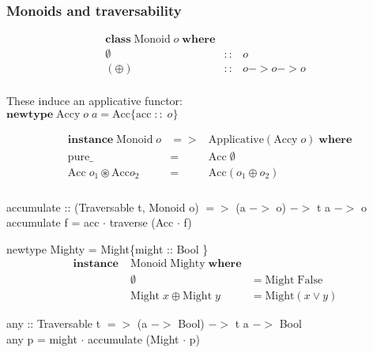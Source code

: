 \documentclass[18pt]{beamer}
\begin{document}
\begin{frame}[fragile]\frametitle{Monoids and traversability}
\begin{align*}
\mathbf{class} \; \mathrm{Monoid} \; o \; \mathbf{where}\\
\emptyset &::& o\\
(\oplus) &::& o -> o -> o
\end{align*}  \\
These induce an applicative functor:\\

$\mathbf{newtype} \; \mathrm{Accy} \; o\; a = \mathrm{Acc} \{\mathrm{acc} \; :: \;o \}$

\begin{align}
&\mathbf{instance} \; \mathrm{Monoid} \; o &=>& \mathrm{Applicative} (\mathrm{Accy}\; o) \; \mathbf{where}\\
&\mathrm{pure} \_ &=& \mathrm{Acc} \; \emptyset\\
&\mathrm{Acc} \; o_1 \circledast \mathrm{Acc} o_2 &=& \mathrm{Acc}(o_1 \oplus o_2)
\end{align}
\end{frame}

\begin{frame}[fragile] \frametitle{}

accumulate :: (Traversable t, Monoid o) $=>$ (a $->$ o) $->$ t a $->$ o
accumulate f = acc $\cdot$ traverse (Acc $\cdot$ f)

newtype Mighty = Might\{might :: Bool \}
\begin{align*}
\mathbf{instance} \; &\mathrm{Monoid \;  Mighty} \; \mathbf{where}\\
&\emptyset &= \mathrm{Might} \; \mathrm{False}\\
&\mathrm{Might}\; x \oplus \mathrm{Might}\; y &= \mathrm{Might} (x \lor y)
\end{align*}

any :: Traversable t $=>$ (a $->$ Bool) $->$ t a $->$ Bool\\
any p = might $\cdot$ accumulate (Might $\cdot$ p)
\end{frame}
\end{document}
